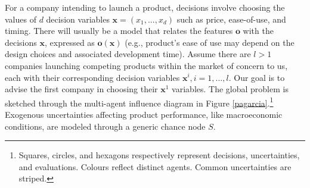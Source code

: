 \documentclass[a4paper,fleqn, 11pt]{cas-sc}
\begin{document}
For a company intending to launch a product, decisions involve choosing the values of $d$ decision variables ${\bm x} = (x_1, ..., x_d)$ such as price, ease-of-use, and timing. There will usually be a model
that relates the features ${\bm o}$ with the decisions ${\bm x}$, 
   expressed as  ${\bm o}(\bm{x})$ (e.g., product's ease of use may depend on the design choices and associated development time). Assume there are $l>1$ companies launching competing products within the market of concern to us, each with their corresponding decision variables 
  ${\bm x}^i, i=1, ..., l$. Our goal is to advise the first company in choosing their %
  ${\bm x}^1$ variables. The global problem is sketched through the multi-agent influence diagram \citep{banks2015adversarial} in Figure \ref{pagarcia}.\footnote{Squares, circles, and hexagons
  respectively represent decisions, uncertainties, and evaluations. Colours reflect distinct 
  agents. Common uncertainties are striped.} Exogenous uncertainties affecting product performance, like 
    macroeconomic conditions, are modeled through a generic  chance node $S$. 
  
   

\end{document}
